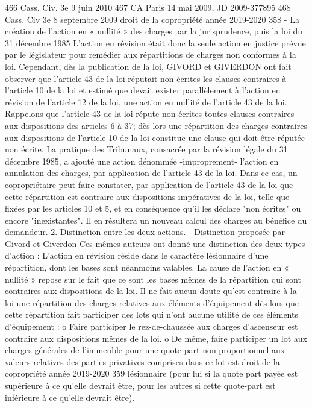 466 Cass. Civ. 3e 9 juin 2010
467 CA Paris 14 mai 2009, JD 2009-377895
468 Cass. Civ 3e 8 septembre 2009
droit de la copropriété année 2019-2020
358
- La création de l’action en « nullité » des charges par la jurisprudence, puis la loi du 31 décembre 1985
L'action en révision était donc la seule action en justice prévue par le législateur pour remédier aux répartitions de charges non conformes à la loi.
Cependant, dès la publication de la loi, GIVORD et GIVERDON ont fait observer que l'article 43 de la loi réputait non écrites les clauses contraires à l'article 10 de la loi et estimé que devait exister parallèlement à l'action en révision de l'article 12 de la loi, une action en nullité de l'article 43 de la loi.
Rappelons que l'article 43 de la loi répute non écrites toutes clauses contraires aux dispositions des articles 6 à 37; dès lors une répartition des charges contraires aux dispositions de l'article 10 de la loi constitue une clause qui doit être réputée non écrite.
La pratique des Tribunaux, consacrée par la révision légale du 31 décembre 1985, a ajouté une action dénommée -improprement- l'action en annulation des charges, par application de l'article 43 de la loi.
Dans ce cas, un copropriétaire peut faire constater, par application de l'article 43 de la loi que cette répartition est contraire aux dispositions impératives de la loi, telle que fixées par les articles 10 et 5, et en conséquence qu'il les déclare "non écrites" ou encore "inexistantes". Il en résultera un nouveau calcul des charges au bénéfice du demandeur.
2. Distinction entre les deux actions.
- Distinction proposée par Givord et Giverdon
Ces mêmes auteurs ont donné une distinction des deux types d'action :
L'action en révision réside dans le caractère lésionnaire d'une répartition, dont les bases sont néanmoins valables.
La cause de l'action en « nullité » repose sur le fait que ce sont les bases mêmes de la répartition qui sont contraires aux dispositions de la loi.
Il ne fait aucun doute qu'est contraire à la loi une répartition des charges relatives aux éléments d'équipement dès lors que cette répartition fait participer des lots qui n'ont aucune utilité de ces éléments d'équipement :
o Faire participer le rez-de-chaussée aux charges d'ascenseur est contraire aux dispositions mêmes de la loi.
o De même, faire participer un lot aux charges générales de l'immeuble pour une quote-part non proportionnel aux valeurs relatives des parties privatives comprises dans ce lot est
droit de la copropriété année 2019-2020
359
lésionnaire (pour lui si la quote part payée est supérieure à ce qu'elle devrait être, pour les autres si cette quote-part est inférieure à ce qu'elle devrait être).
